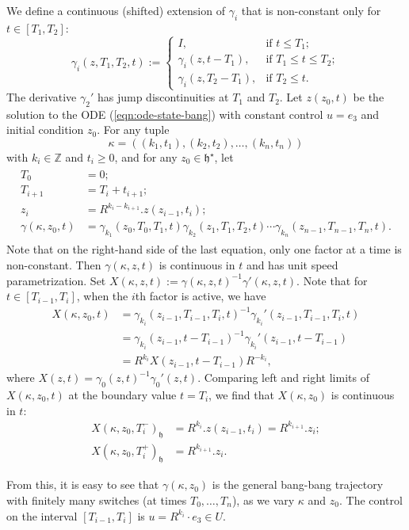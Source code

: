\documentclass{article}
\theoremstyle{remark}
\newcommand{\ring}[1]{\mathbb{#1}}
\def\h{\mathfrak h}
\def\hstar{{\mathfrak h}^\star}
\begin{document}
We define a continuous (shifted) extension of $\gamma_i$ that is
non-constant only for $t\in [T_1,T_2]$:
\[
\gamma_i(z,T_1,T_2,t) := \begin{cases} 
I, & \text{if } t \le T_1;\\
\gamma_i(z,t-T_1), &\text{if } T_1\le t\le T_2;\\
\gamma_i(z,T_2-T_1), &\text{if } T_2\le t.
\end{cases}
\]
The derivative $\gamma_2'$ has jump discontinuities at $T_1$ and
$T_2$.  Let $z(z_0,t)$ be the solution to the ODE
(\ref{eqn:ode-state-bang}) with constant control $u=e_3$ and
initial condition $z_0$.  For any tuple 
\[
\kappa =
((k_1,t_1),(k_2,t_2),\ldots,(k_{n},t_{n}))
\]
 with $k_i\in\ring{Z}$ and
$t_i\ge 0$, and for any $z_0\in \hstar$, let
\begin{align}
\begin{split}
T_0 &= 0;\\
T_{i+1} &= T_i + t_{i+1};\\
z_{i} &= R^{k_i -k_{i+1}}. z(z_{i-1},t_i);\\
\gamma(\kappa,z_0,t) &= \gamma_{k_1}(z_0,T_0,T_1,t) 
\gamma_{k_2}(z_1,T_1,T_2,t)\cdots \gamma_{k_n}(z_{n-1},T_{n-1},T_n,t).
\end{split}
\end{align}
Note that on the right-hand side of the last equation, only one factor
at a time is non-constant.  Then $\gamma(\kappa,z,t)$ is continuous in
$t$ and has unit speed parametrization.  Set $X(\kappa,z,t):=
\gamma(\kappa,z,t)^{-1} \gamma'(\kappa,z,t)$.  Note that for $t\in
[T_{i-1},T_{i}]$, when the $i$th factor is active, we have
\begin{align*}
X(\kappa,z_0,t) &= \gamma_{k_i}(z_{i-1},T_{i-1},T_{i},t)^{-1} 
\gamma_{k_i}'(z_{i-1},T_{i-1},T_{i},t) \\
  &=\gamma_{k_i}(z_{i-1},t-T_{i-1})^{-1}\gamma_{k_i}'(z_{i-1},t-T_{i-1})\\
  &= R^{k_i} X(z_{i-1},t - T_{i-1}) R^{-k_i},
\end{align*}
where $X(z,t) = \gamma_0(z,t)^{-1} \gamma_0'(z,t)$.  Comparing left
and right limits of $X(\kappa,z_0,t)$ at the boundary value $t=T_i$, we
find that $X(\kappa,z_0)$ is continuous in $t$:
\begin{align*}
X(\kappa,z_0,T_i^-)_\h &= R^{k_i}. z(z_{i-1},t_i) = R^{k_{i+1}}.z_i;\\
X(\kappa,z_0,T_i^+)_\h &= R^{k_{i+1}}.z_i.
\end{align*}


From this, it is easy to see that $\gamma(\kappa,z_0)$ is the general
bang-bang trajectory with finitely many switches (at times
$T_0,\ldots, T_n$), as we vary $\kappa$ and $z_0$. The control on the
interval $[T_{i-1},T_{i}]$ is $u=R^{k_i}\cdot e_3\in U$.
\end{document}
